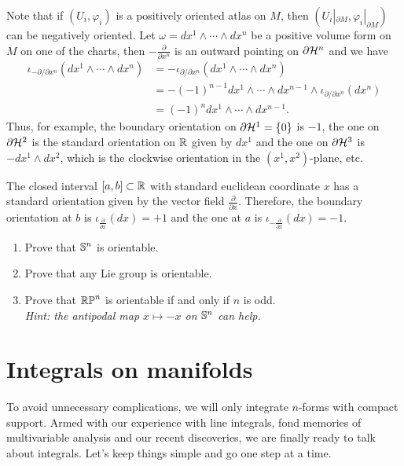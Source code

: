 Note that if $(U_i, \varphi_i)$ is a positively oriented atlas on $M$, then $(U_i|_{\partial M}, \varphi_i|_{\partial M})$ can be negatively oriented. 
Let $\omega = dx^1\wedge\cdots\wedge dx^n$ be a positive volume form on $M$ on one of the charts, then $-\frac{\partial}{\partial x^n}$ is an outward pointing on $\partial \mathcal{H}^n$ and we have
\begin{align}
  \iota_{-{\partial}/\!{\partial x^n}} (dx^1\wedge\cdots\wedge dx^n)
  &= -\iota_{{\partial}/\!{\partial x^n}} (dx^1\wedge\cdots\wedge dx^n) \\
  &= -(-1)^{n-1} dx^1\wedge\cdots\wedge dx^{n-1}\wedge \iota_{{\partial}/\!{\partial x^n}} (dx^n) \\
  &= (-1)^n dx^1\wedge\cdots\wedge dx^{n-1}.
\end{align}
Thus, for example, the boundary orientation on $\partial \mathcal{H}^1 = \{0\}$ is $-1$, the one on $\partial \mathcal{H}^2$ is the standard orientation on $\mathbb{R}$ given by $dx^1$ and the one on $\partial \mathcal{H}^3$ is $-dx^1\wedge dx^2$, which is the clockwise orientation in the $(x^1, x^2)$-plane, etc.

\begin{example}\label{ex:int:bdryo}
  The closed interval $[a,b]\subset\mathbb{R}$ with standard euclidean coordinate $x$ has a standard orientation given by the vector field $\frac{\partial}{\partial x}$. 
  Therefore, the boundary orientation at $b$ is $\iota_{\frac{\partial}{\partial x}}(dx) = +1$ and the one at $a$ is $\iota_{-\frac{\partial}{\partial x}}(dx) = -1$.
\end{example}

\begin{exercise}
  \begin{enumerate}
    \item Prove that $\mathbb{S}^n$ is orientable.
    \item Prove that any Lie group is orientable.
    \item Prove that $\mathbb{RP}^n$ is orientable if and only if $n$ is odd. \\
      \textit{\small Hint: the antipodal map $x\mapsto -x$ on $\mathbb{S}^n$ can help.}
  \end{enumerate}
\end{exercise}

\section{Integrals on manifolds}

To avoid unnecessary complications, we will only integrate $n$-forms with compact support.
Armed with our experience with line integrals, fond memories of multivariable analysis and our recent discoveries, we are finally ready to talk about integrals.
Let's keep things simple and go one step at a time.

